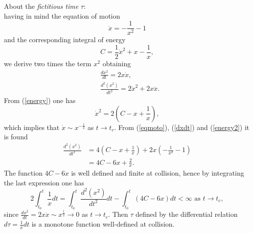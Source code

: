 \documentclass{article}
\begin{document}
About the \textit{fictitious time} $\tau$: \\
having in mind the equation of motion
\begin{equation}\label{eqmoto}
    \ddot x = -\frac{1}{x^2} - 1
\end{equation}
and the corresponding integral of energy
\begin{equation}\label{energy}
    C = \frac{1}{2}\dot x^2 +x - \frac{1}{x},
\end{equation}
we derive two times the term $x^2$ obtaining
\begin{equation}\label{dxdt}
    \begin{split}
        &\frac{dx^2}{dt} = 2x \dot x, \\
        &\frac{d^2(x^2)}{dt^2} = 2\dot x^2 + 2x \ddot x.
    \end{split}
\end{equation}
From (\ref{energy}) one has
\begin{equation}\label{energy2}
    \dot x^2 = 2(C-x+\frac{1}{x}),
\end{equation}
which implies that $\dot x \sim x^{-\frac{1}{2}}$ as $t \to t_c$. From (\ref{eqmoto}), (\ref{dxdt}) and (\ref{energy2}) it is found
\begin{equation*}
\begin{split}
    \frac{d^2(x^2)}{dt^2} &= 4(C-x+\frac{1}{x}) +2x(-\frac{1}{x^2} - 1) \\
    & = 4C - 6x + \frac{2}{x}.
    \end{split}
\end{equation*}
The function $4C-6x$ is well defined and finite at collision, hence by integrating the last expression one has
\begin{equation}
    2\int_{t_0}^{t} \frac{1}{x}dt = \int_{t_0}^{t} \frac{d^2(x^2)}{dt^2}dt - \int_{t_0}^{t} (4C-6x)dt < \infty \text{ as } t\to t_c,
\end{equation}
since  $\frac{dx^2}{dt} = 2x \dot x \sim x^{\frac{1}{2}} \to 0$ as $t \to t_c$. Then $\tau$ defined by the differential relation $d\tau = \frac{1}{x}dt$ is a monotone function well-defined at collision.
\end{document}
